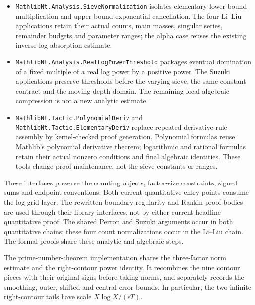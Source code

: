 \begin{itemize}
      real smoothing parameter in $[1/2,M+1/2]$ and $1/2+(14\log M+4)/\pi$ for
      natural-valued selectors $Y(q,\chi)\le M$. These multiply the same
      aggregate rank-one large-sieve bound; the selector keeps four rank-one
      contributions. Applying the sharp comparison at each cutoff and summing
      with the nonnegative weight $q/\varphi(q)$ adds $8/(\pi M)$ times the
      product of the rectangular coefficient $L^1$ mass and weighted family mass. The
      single-character comparison uses natural $M\ge1$, natural $Y\le M$ and positive
      products; the aggregate sharp interfaces retain $mn\le M$.
\item \texttt{MathlibNt.Analysis.SieveNormalization} isolates elementary
      lower-bound multiplication and upper-bound exponential cancellation.
      The four Li--Liu applications retain their actual counts, main masses,
      singular series, remainder budgets and parameter ranges; the alpha
      case reuses the existing inverse-log absorption estimate.
\item \texttt{MathlibNt.Analysis.RealLogPowerThreshold} packages eventual
      domination of a fixed multiple of a real log power by a positive power.
      The Suzuki applications preserve thresholds before the varying sieve,
      the same-constant contract and the moving-depth domain. The remaining
      local algebraic compression is not a new analytic estimate.
\item \texttt{MathlibNt.Tactic.PolynomialDeriv} and
      \texttt{MathlibNt.Tactic.ElementaryDeriv} replace repeated derivative-rule
      assembly by kernel-checked proof generation. Polynomial formulas reuse
      Mathlib's polynomial derivative theorem; logarithmic and rational formulas
      retain their actual nonzero conditions and final algebraic identities.
      These tools change proof maintenance, not the sieve constants or ranges.
\end{itemize}
These interfaces preserve the counting objects, factor-size constraints,
signed sums and endpoint conventions. Both current quantitative entry points
consume the log-grid layer. The rewritten boundary-regularity and Rankin
proof bodies are used through their library interfaces, not by either
current headline quantitative proof.
The shared Perron and Suzuki arguments occur in both quantitative chains;
these four count normalizations occur in the Li--Liu chain. The formal proofs
share these analytic and algebraic steps.

The prime-number-theorem implementation shares the three-factor norm estimate
and the right-contour power identity. It recombines the nine contour pieces
with their original signs before taking norms, and separately records the
smoothing, outer, shifted and central error bounds. In particular, the two
infinite right-contour tails have scale $X\log X/(\epsilon T)$.


